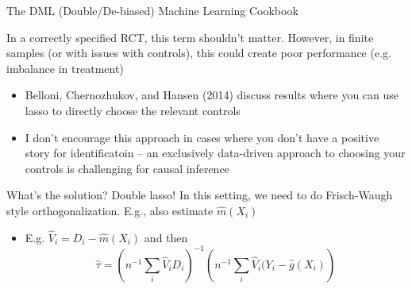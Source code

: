 \documentclass[notes,11pt, aspectratio=169]{beamer}
\newenvironment{wideitemize}{\itemize\addtolength{\itemsep}{10pt}}{\enditemize}
\begin{document}
\begin{frame}{The DML (Double/De-biased) Machine Learning Cookbook}
  \begin{wideitemize}
  \item In a correctly specified RCT, this term shouldn't
    matter. However, in finite samples (or with issues with controls),
    this could create poor performance (e.g. imbalance in treatment)
    \begin{itemize}
    \item Belloni, Chernozhukov, and Hansen (2014) discuss results
      where you can use lasso to directly choose the relevant controls
    \item I don't encourage this approach in cases where you don't
      have a positive story for identificatoin -- an exclusively
      data-driven approach to choosing your controls is challenging
      for causal inference
    \end{itemize}
  \item What's the solution? Double lasso! In this setting, we need to
    do Frisch-Waugh style orthogonalization. E.g., also estimate
    $\hat{m}(X_{i})$
    \begin{itemize}
    \item E.g. $\hat{V}_{i} = D_{i} - \hat{m}(X_{i})$  and then
  $$\hat{\tau} = \left(n^{-1}\sum_{i}\hat{V}_{i}D_{i}\right)^{-1}\left(n^{-1}\sum_{i}\hat{V}_{i}(Y_{i} - \hat{g}(X_{i})\right)$$      
    \end{itemize}
  \end{wideitemize}
\end{frame}
\end{document}
